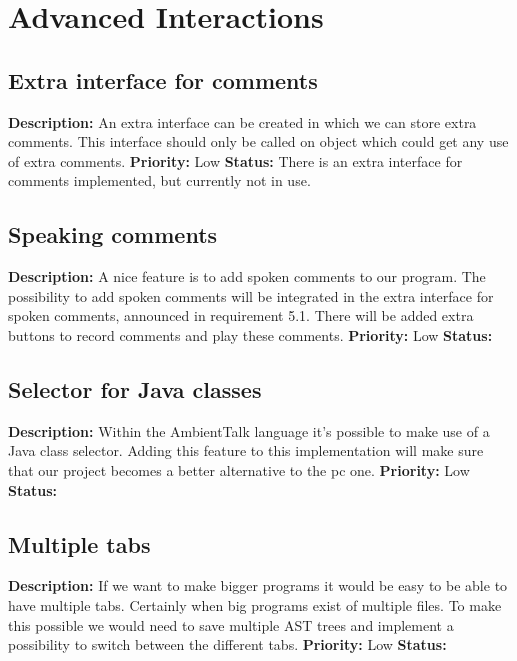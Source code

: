 \documentclass[a4paper,12pt]{report}
\begin{document}
\section{Advanced Interactions}
\subsection{Extra interface for comments}
\textbf{Description: } An extra interface can be created in which we can store extra comments. This interface should only be called on object which could get any use of extra comments.
 \newline
\textbf{Priority:} Low \newline
\textbf{Status: } There is an extra interface for comments implemented, but currently not in use.\newline
\subsection{Speaking comments}
\textbf{Description: } A nice feature is to add spoken comments to our program. The possibility to add spoken comments will be integrated in the
extra interface for spoken comments, announced in requirement 5.1. There will be added extra buttons to record comments and play these comments.\newline
\textbf{Priority:} Low \newline
\textbf{Status: } \newline
\subsection{Selector for Java classes}
\textbf{Description: } Within the AmbientTalk language it's possible to make use of a Java class selector. Adding this feature to this implementation
will make sure that our project becomes a better alternative to the pc one.\newline
\textbf{Priority:} Low \newline
\textbf{Status: } \newline
\subsection{Multiple tabs}
\textbf{Description: } If we want to make bigger programs it would be easy to be able to have multiple tabs. Certainly when big programs exist of multiple files. To make this possible we would need
to save multiple AST trees and implement a possibility to switch between the different tabs.\newline
\textbf{Priority:} Low \newline
\textbf{Status: }
\end{document}
